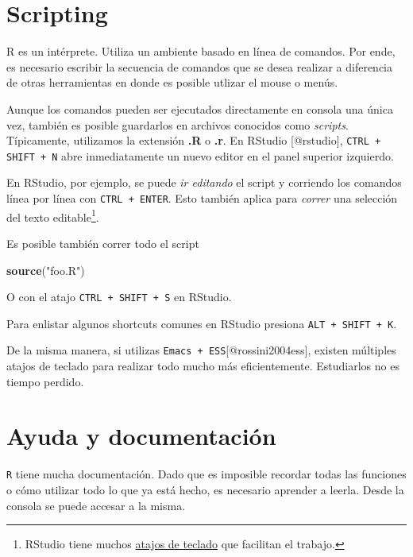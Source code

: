 \documentclass[]{article}
\newenvironment{Shaded}{\begin{snugshade}}{\end{snugshade}}
\newcommand{\KeywordTok}[1]{\textcolor[rgb]{0.13,0.29,0.53}{\textbf{{#1}}}}
\newcommand{\StringTok}[1]{\textcolor[rgb]{0.31,0.60,0.02}{{#1}}}
\newcommand{\NormalTok}[1]{{#1}}
\let\rmarkdownfootnote\footnote%
\def\footnote{\protect\rmarkdownfootnote}
\begin{document}
\section{Scripting}\label{scripting}

R es un intérprete. Utiliza un ambiente basado en línea de comandos. Por
ende, es necesario escribir la secuencia de comandos que se desea
realizar a diferencia de otras herramientas en donde es posible utlizar
el mouse o menús.

Aunque los comandos pueden ser ejecutados directamente en consola una
única vez, también es posible guardarlos en archivos conocidos como
\emph{scripts}. Típicamente, utilizamos la extensión \textbf{.R} o
\textbf{.r}. En RStudio {[}@rstudio{]}, \texttt{CTRL + SHIFT + N} abre
inmediatamente un nuevo editor en el panel superior izquierdo.

En RStudio, por ejemplo, se puede \emph{ir editando} el script y
corriendo los comandos línea por línea con \texttt{CTRL + ENTER}. Esto
también aplica para \emph{correr} una selección del texto
editable\footnote{RStudio tiene muchos
  \href{https://support.rstudio.com/hc/en-us/articles/200711853-Keyboard-Shortcuts}{atajos
  de teclado} que facilitan el trabajo.}.

Es posible también correr todo el script

\begin{Shaded}
\begin{Highlighting}[]
\KeywordTok{source}\NormalTok{(}\StringTok{"foo.R"}\NormalTok{)}
\end{Highlighting}
\end{Shaded}

O con el atajo \texttt{CTRL + SHIFT + S} en RStudio.

Para enlistar algunos shortcuts comunes en RStudio presiona
\texttt{ALT + SHIFT + K}.

De la misma manera, si utilizas
\texttt{Emacs + ESS}{[}@rossini2004ess{]}, existen múltiples atajos de
teclado para realizar todo mucho más eficientemente. Estudiarlos no es
tiempo perdido.

\section{Ayuda y documentación}\label{ayuda-y-documentacion}

\texttt{R} tiene mucha documentación. Dado que es imposible recordar
todas las funciones o cómo utilizar todo lo que ya está hecho, es
necesario aprender a leerla. Desde la consola se puede accesar a la
misma.
\end{document}
